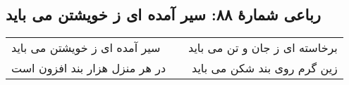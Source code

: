 \begin{center}
\section*{رباعی شمارهٔ ۸۸:  سیر آمده ای ز خویشتن می باید}
\label{sec:088}
\begin{longtable}{l p{0.5cm} r}
 سیر آمده ای ز خویشتن می باید
&&
برخاسته ای ز جان و تن می باید
\\
در هر منزل هزار بند افزون است
&&
زین گرم روی بند شکن می باید 
\\
\end{longtable}
\end{center}
